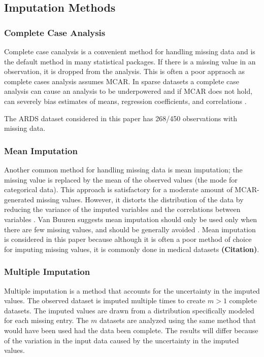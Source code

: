 \documentclass[12pt,]{article}
\begin{document}
\subsection{Imputation Methods}\label{imputation-methods}

\subsubsection{Complete Case Analysis}\label{complete-case-analysis}

Complete case canalysis is a convenient method for handling missing data
and is the default method in many statistical packages. If there is a
missing value in an observation, it is dropped from the analysis. This
is often a poor appraoch as complete cases analysis assumes MCAR. In
sparse datasets a complete case analysis can cause an analysis to be
underpowered and if MCAR does not hold, can severely bias estimates of
means, regression coefficients, and correlations
\citep{van_buuren_flexible_2012}.

The ARDS dataset considered in this paper has 268/450 observations with
missing data.

\subsubsection{Mean Imputation}\label{mean-imputation}

Another common method for handling missing data is mean imputation; the
missing value is replaced by the mean of the observed values (the mode
for categorical data). This approach is satisfactory for a moderate
amount of MCAR-generated missing values. However, it distorts the
distribution of the data by reducing the variance of the imputed
variables and the correlations between variables
\citep{little_bayes_2014}. Van Buuren suggests mean imputation should
only be used only when there are few missing values, and should be
generally avoided \citep{van_buuren_flexible_2012}. Mean imputation is
considered in this paper because although it is often a poor method of
choice for imputing missing values, it is commonly done in medical
datasets \textbf{(Citation)}.

\subsubsection{Multiple Imputation}\label{multiple-imputation}

Multiple imputation is a method that accounts for the uncertainty in the
imputed values. The observed dataset is imputed multiple times to create
\(m>1\) complete datasets. The imputed values are drawn from a
distribution specifically modeled for each missing entry. The \(m\)
datasets are analyzed using the same method that would have been used
had the data been complete. The results will differ because of the
variation in the input data caused by the uncertainty in the imputed
values.
\end{document}
